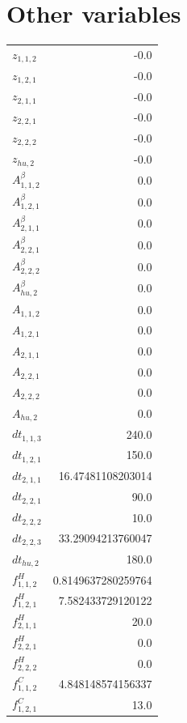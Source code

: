 \documentclass{article}%
\makeatletter
\let\mcnewpage=\newpage%
\newcommand{\TrickSupertabularIntoMulticols}{%
\renewcommand\newpage{%
\if@firstcolumn%
\hrule width\linewidth height0pt%
\columnbreak%
\else%
\mcnewpage%
\fi%
}%
}%
\makeatother
\begin{document}
\section{Other variables}%
\thispagestyle{plain}%
\begin{multicols*}{3}%
\TrickSupertabularIntoMulticols%
%
\begin{supertabular}{lr}%
	$z_{1,1,2}$ & -0.0 \\%
	$z_{1,2,1}$ & -0.0 \\%
	$z_{2,1,1}$ & -0.0 \\%
	$z_{2,2,1}$ & -0.0 \\%
	$z_{2,2,2}$ & -0.0 \\%
	$z_{hu,2}$ & -0.0 \\%
	$A_{1,1,2}^{\beta}$ & 0.0 \\%
	$A_{1,2,1}^{\beta}$ & 0.0 \\%
	$A_{2,1,1}^{\beta}$ & 0.0 \\%
	$A_{2,2,1}^{\beta}$ & 0.0 \\%
	$A_{2,2,2}^{\beta}$ & 0.0 \\%
	$A_{hu,2}^{\beta}$ & 0.0 \\%
	$A_{1,1,2}$ & 0.0 \\%
	$A_{1,2,1}$ & 0.0 \\%
	$A_{2,1,1}$ & 0.0 \\%
	$A_{2,2,1}$ & 0.0 \\%
	$A_{2,2,2}$ & 0.0 \\%
	$A_{hu,2}$ & 0.0 \\%
	$dt_{1,1,3}$ & 240.0 \\%
	$dt_{1,2,1}$ & 150.0 \\%
	$dt_{2,1,1}$ & 16.47481108203014 \\%
	$dt_{2,2,1}$ & 90.0 \\%
	$dt_{2,2,2}$ & 10.0 \\%
	$dt_{2,2,3}$ & 33.29094213760047 \\%
	$dt_{hu,2}$ & 180.0 \\%
	$f_{1,1,2}^{H}$ & 0.8149637280259764 \\%
	$f_{1,2,1}^{H}$ & 7.582433729120122 \\%
	$f_{2,1,1}^{H}$ & 20.0 \\%
	$f_{2,2,1}^{H}$ & 0.0 \\%
	$f_{2,2,2}^{H}$ & 0.0 \\%
	$f_{1,1,2}^{C}$ & 4.848148574156337 \\%
	$f_{1,2,1}^{C}$ & 13.0 \\%

\end{supertabular}
\end{multicols*}
\end{document}

